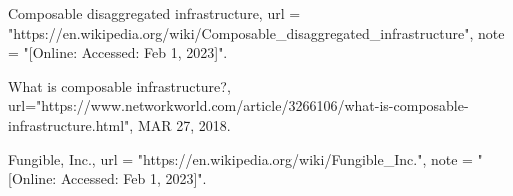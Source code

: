 \documentclass[conference]{IEEEtran}
\begin{document}
\begin{thebibliography}{20}
  Composable disaggregated infrastructure,
  url = "https://en.wikipedia.org/wiki/Composable_disaggregated_infrastructure",
  note = "[Online: Accessed: Feb 1, 2023]".

  What is composable infrastructure?,
  url="https://www.networkworld.com/article/3266106/what-is-composable-infrastructure.html",
  MAR 27, 2018.

  Fungible, Inc.,
  url = "https://en.wikipedia.org/wiki/Fungible_Inc.",
  note = "[Online: Accessed: Feb 1, 2023]".


\end{thebibliography}
\end{document}
